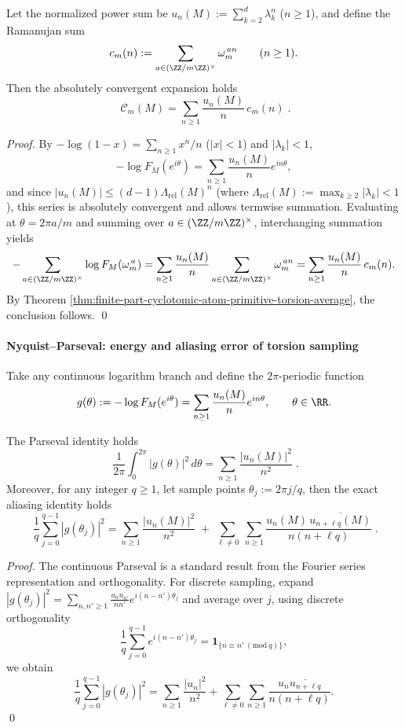 \begin{corollary}\label{cor:finite-part-cyclotomic-atom-ramanujan-projection}
Let the normalized power sum be
\(
u_n(M):=\sum_{k=2}^{d}\lambda_k^{n}
\)
(\(n\ge 1\)), and define the Ramanujan sum
\[
c_m(n):=\sum_{a\in(\ZZ/m\ZZ)^\times}\omega_m^{\,an}\qquad(n\ge 1).
\]
Then the absolutely convergent expansion holds
\[
\boxed{\;
\mathcal{C}_m(M)=\sum_{n\ge 1}\frac{u_n(M)}{n}\,c_m(n)\; }.
\]
\end{corollary}
\begin{proof}
By \(-\log(1-x)=\sum_{n\ge 1}x^n/n\) (\(|x|<1\)) and \(|\lambda_k|<1\),
\[
-\log F_M(e^{i\theta})
=\sum_{n\ge 1}\frac{u_n(M)}{n}e^{in\theta},
\]
and since \(|u_n(M)|\le (d-1)\Lambda_{\mathrm{rel}}(M)^n\) (where \(\Lambda_{\mathrm{rel}}(M):=\max_{k\ge 2}|\lambda_k|<1\)), this series is absolutely convergent and allows termwise summation.
Evaluating at \(\theta=2\pi a/m\) and summing over \(a\in(\ZZ/m\ZZ)^\times\), interchanging summation yields
\[
-\sum_{a\in(\ZZ/m\ZZ)^\times}\log F_M(\omega_m^{\,a})
=\sum_{n\ge 1}\frac{u_n(M)}{n}\sum_{a\in(\ZZ/m\ZZ)^\times}\omega_m^{\,an}
=\sum_{n\ge 1}\frac{u_n(M)}{n}\,c_m(n).
\]
By Theorem \ref{thm:finite-part-cyclotomic-atom-primitive-torsion-average}, the conclusion follows. \qed
\end{proof}

\paragraph{Nyquist--Parseval: energy and aliasing error of torsion sampling}
Take any continuous logarithm branch and define the \(2\pi\)-periodic function
\[
g(\theta):=-\log F_M(e^{i\theta})
=\sum_{n\ge 1}\frac{u_n(M)}{n}e^{in\theta},
\qquad \theta\in\RR.
\]

\begin{theorem}\label{thm:finite-part-nyquist-parseval-aliasing}
The Parseval identity holds
\[
\boxed{\;
\frac{1}{2\pi}\int_{0}^{2\pi}|g(\theta)|^2\,d\theta=\sum_{n\ge 1}\frac{|u_n(M)|^2}{n^2}\; }.
\]
Moreover, for any integer \(q\ge 1\), let sample points \(\theta_j:=2\pi j/q\), then the exact aliasing identity holds
\[
\boxed{\;
\frac{1}{q}\sum_{j=0}^{q-1}|g(\theta_j)|^2
=\sum_{n\ge 1}\frac{|u_n(M)|^2}{n^2}
\;+\;
\sum_{\ell\ne 0}\ \sum_{n\ge 1}\frac{u_n(M)\,\overline{u_{n+\ell q}(M)}}{n(n+\ell q)}\; }.
\]
\end{theorem}
\begin{proof}
The continuous Parseval is a standard result from the Fourier series representation and orthogonality.
For discrete sampling, expand
\(
|g(\theta_j)|^2
=\sum_{n,n'\ge 1}\frac{u_n\overline{u_{n'}}}{nn'}e^{i(n-n')\theta_j}
\)
and average over \(j\), using discrete orthogonality
\[
\frac{1}{q}\sum_{j=0}^{q-1}e^{i(n-n')\theta_j}
=
\mathbf 1_{\{n\equiv n'\ (\mathrm{mod}\ q)\}},
\]
we obtain
\[
\frac{1}{q}\sum_{j=0}^{q-1}|g(\theta_j)|^2
=\sum_{n\ge 1}\frac{|u_n|^2}{n^2}
+\sum_{\ell\ne 0}\sum_{n\ge 1}\frac{u_n\overline{u_{n+\ell q}}}{n(n+\ell q)}.
\]
\qed
\end{proof}

